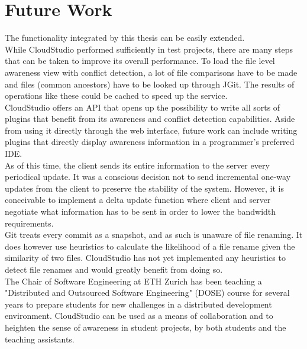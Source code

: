 

\chapter{Future Work}\label{futurework}

The functionality integrated by this thesis can be easily extended. \\

While CloudStudio performed sufficiently in test projects, there are many steps that can be taken to improve its overall performance. To load the file level awareness view with conflict detection, a lot of file comparisons have to be made and files (common ancestors) have to be looked up through JGit. The results of operations like these could be cached to speed up the service. \\

CloudStudio offers an API that opens up the possibility to write all sorts of plugins that benefit from its awareness and conflict detection capabilities. Aside from using it directly through the web interface, future work can include writing plugins that directly display awareness information in a programmer's preferred IDE. \\

As of this time, the client sends its entire information to the server every periodical update. It was a conscious decision not to send incremental one-way updates from the client to preserve the stability of the system. However, it is conceivable to implement a delta update function where client and server negotiate what information has to be sent in order to lower the bandwidth requirements. \\

Git treats every commit as a snapshot, and as such is unaware of file renaming. It does however use heuristics to calculate the likelihood of a file rename given the similarity of two files. CloudStudio has not yet implemented any heuristics to detect file renames and would greatly benefit from doing so. \\

The Chair of Software Engineering at ETH Zurich has been teaching a "Distributed and Outsourced Software Engineering" (DOSE) course for several years to prepare students for new challenges in a distributed development environment. \cite{ref19, ref20} CloudStudio can be used as a means of collaboration and to heighten the sense of awareness in student projects, by both students and the teaching assistants.



